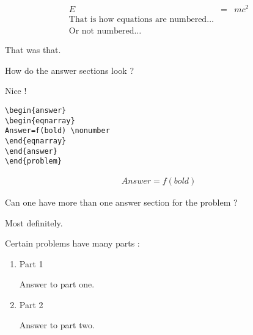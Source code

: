 \documentclass{assignment}
\begin{document}
\begin{problemlist}
\begin{problem}
\begin{eqnarray}
E & = & mc^{2} \label{eqn:emc2} \\
\textrm{That is how equations are numbered} \ldots \label{eqn:numbered} \\
\textrm{Or not numbered} \ldots \nonumber
\end{eqnarray}


\begin{answer}
That was that.
\end{answer}
\end{problem}

\pbitem How do the answer sections look ?

\begin{problem}

Nice !

\begin{verbatim}
\begin{answer}
\begin{eqnarray}
Answer=f(bold) \nonumber
\end{eqnarray}
\end{answer}
\end{problem}
\end{verbatim}


\begin{answer}
\begin{eqnarray}
Answer=f(bold) \nonumber
\end{eqnarray}
\end{answer}
\end{problem}


\pbitem Can one have more than one answer section for the problem ?

\begin{problem}

Most definitely.

Certain problems have many parts :

\begin{enumerate}
\item Part 1

\begin{answer}
Answer to part one.
\end{answer}

\item Part 2

\begin{answer}
Answer to part two.
\end{answer}

\end{enumerate}


\end{problem}
\end{problemlist}
\end{document}
